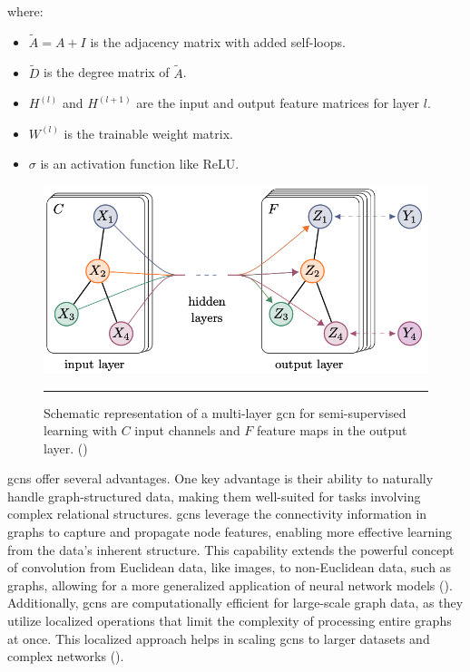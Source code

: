 where:
\begin{itemize}
    \item \( \tilde{A} = A + I \) is the adjacency matrix with added self-loops.
    \item \( \tilde{D} \) is the degree matrix of \( \tilde{A} \).
    \item \( H^{(l)} \) and \( H^{(l+1)} \) are the input and output feature matrices for layer \( l \).
    \item \( W^{(l)} \) is the trainable weight matrix.
    \item \( \sigma \) is an activation function like ReLU.
\end{itemize}

\begin{figure}[htbp]
    \centering
 \includegraphics[width=.7\textwidth]{03_Figures/literature-review/gcn-semisupervised-learning.png}
     \rule{35em}{0.5pt}
    \caption{Schematic representation of a multi-layer \gls{gcn} for semi-supervised learning with $C$ input channels and $F$ feature maps in the output layer.  (\cite{Kipf2017})} 
 \label{fig:gcn-semisupervised-learning}
\end{figure}

\glspl{gcn} offer several advantages.
One key advantage is their ability to naturally handle graph-structured data, making them well-suited for tasks involving complex relational structures.
\glspl{gcn} leverage the connectivity information in graphs to capture and propagate node features, enabling more effective learning from the data's inherent structure.
This capability extends the powerful concept of convolution from Euclidean data, like images, to non-Euclidean data, such as graphs, allowing for a more generalized application of neural network models (\cite{Wu2021}).
Additionally, \glspl{gcn} are computationally efficient for large-scale graph data, as they utilize localized operations that limit the complexity of processing entire graphs at once.
This localized approach helps in scaling \glspl{gcn} to larger datasets and complex networks (\cite{Li2018}).

